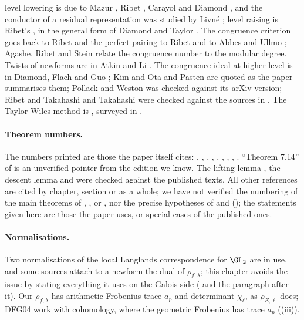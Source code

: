 level lowering is due to Mazur \cite{Mazur77}, Ribet \cite{Ribet90,Ribet91}, Carayol \cite{Carayol89} and Diamond \cite{Diamond95}, and the conductor of a residual
representation was studied by Livn\'e \cite{Livne89}; level raising is Ribet's \cite{Ribet84}, in the general form of Diamond and Taylor \cite{DiamondTaylor94}. The
congruence criterion goes back to Ribet \cite{Ribet83} and the perfect pairing to Ribet and to Abbes and Ullmo \cite{AU96}; Agashe, Ribet and Stein \cite{ARS12}
relate the congruence number to the modular degree. Twists of newforms are in Atkin and Li \cite{AtkinLi78}. The congruence ideal at higher level is
in Diamond, Flach and Guo \cite{DFG04}; Kim and Ota \cite{KimOta} and Pasten \cite{Pasten} are quoted as the paper summarises them; Pollack and Weston \cite[Theorem 6.11]{PollackWeston11} was checked against its arXiv version;
Ribet and Takahashi \cite{RibetTakahashi97} and Takahashi \cite{Takahashi01} were checked against the sources in . The Taylor-Wiles method is \cite{Wiles95,TaylorWiles}, surveyed in \cite{DDT}.

\paragraph{Theorem numbers.} The numbers printed are those the paper itself cites: \cite[Theorems 3.1(e), 3.15]{DDT}, \cite[Theorem 2.2]{Ribet83},
\cite[Lemma 2.1]{AU96}, \cite[Theorem 3]{AtkinLehner70}, \cite[Theorem 3.1]{AtkinLi78}, \cite[Theorem 2.2]{ARS12}, \cite[Section 2]{Edixhoven92}, \cite[Proposition 1.4(c)]{DFG04},
\cite[Theorem 1.1, Definition 2.12]{KimOta}. ``Theorem 7.14'' of \cite{Shimura71} is an unverified pointer from the edition we know. The lifting lemma \cite[Lemme 6.11]{DeligneSerre74},
the descent lemma \cite[Lemme 6.13]{DeligneSerre74} and \cite[Th\'eor\`eme 2]{Carayol94} were checked against the published texts. All other references are cited by
chapter, section or as a whole; we have not verified the numbering of the main theorems of \cite{Carayol86}, \cite{Ribet84}, \cite{Ribet90} or \cite{DiamondTaylor94},
nor the precise hypotheses of \cite{Ribet84} and \cite{Carayol89} (); the statements given here are those the
paper uses, or special cases of the published ones.

\paragraph{Normalisations.} Two normalisations of the local Langlands correspondence for $\GL_2$ are in use, and some sources attach to a newform the
dual of $\rho_{f,\lambda}$; this chapter avoids the issue by stating everything it uses on the Galois side ( and the paragraph after it).
Our $\rho_{f,\lambda}$ has arithmetic Frobenius trace $a_p$ and determinant $\chi_\ell$, as $\rho_{E,\ell}$ does; DFG04 work with cohomology, where the geometric Frobenius has
trace $a_p$ ((iii)).

